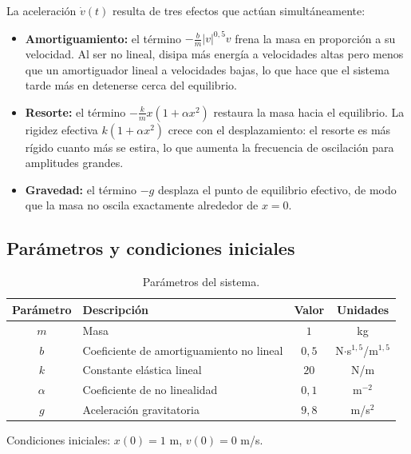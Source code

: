 \documentclass[12pt, a4paper]{article}
\begin{document}
La aceleración $\dot{v}(t)$ resulta de tres efectos que actúan simultáneamente:

\begin{itemize}
    \item \textbf{Amortiguamiento:} el término $-\frac{b}{m}|v|^{0{,}5}v$ frena la masa en proporción a su velocidad. Al ser no lineal, disipa más energía a velocidades altas pero menos que un amortiguador lineal a velocidades bajas, lo que hace que el sistema tarde más en detenerse cerca del equilibrio.

    \item \textbf{Resorte:} el término $-\frac{k}{m}x(1+\alpha x^2)$ restaura la masa hacia el equilibrio. La rigidez efectiva $k(1+\alpha x^2)$ crece con el desplazamiento: el resorte es más rígido cuanto más se estira, lo que aumenta la frecuencia de oscilación para amplitudes grandes.

    \item \textbf{Gravedad:} el término $-g$ desplaza el punto de equilibrio efectivo, de modo que la masa no oscila exactamente alrededor de $x=0$.
\end{itemize}

\subsection{Parámetros y condiciones iniciales}

\begin{table}[H]
    \centering
    \caption{Parámetros del sistema.}
    \begin{tabular}{clcc}
        \toprule
        \textbf{Parámetro} & \textbf{Descripción} & \textbf{Valor} & \textbf{Unidades} \\
        \midrule
        $m$      & Masa                                   & $1$   & kg \\
        $b$      & Coeficiente de amortiguamiento no lineal & $0{,}5$ & N$\cdot$s$^{1{,}5}$/m$^{1{,}5}$ \\
        $k$      & Constante elástica lineal              & $20$  & N/m \\
        $\alpha$ & Coeficiente de no linealidad           & $0{,}1$ & m$^{-2}$ \\
        $g$      & Aceleración gravitatoria               & $9{,}8$ & m/s$^2$ \\
        \bottomrule
    \end{tabular}
\end{table}

Condiciones iniciales: $x(0) = 1$ m, $v(0) = 0$ m/s.
\end{document}
